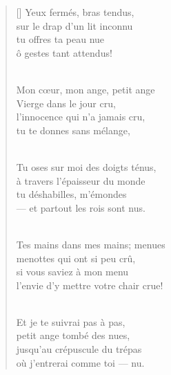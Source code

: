 \documentclass[11pt,a4paper]{article}
\begin{document}
\thispagestyle{empty}


\settowidth{\versewidth}{l'envie d'y mettre votre chair crue!}

\bigskip

\begin{verse}[\versewidth]
Yeux fermés, bras tendus, \\
sur le drap d'un lit inconnu \\
tu offres ta peau nue \\
ô gestes tant attendus! \\ \

Mon cœur, mon ange, petit ange \\
Vierge dans le jour cru, \\
l'innocence qui n'a jamais cru, \\
tu te donnes sans mélange, \\ \

Tu oses sur moi des doigts ténus, \\
à travers l'épaisseur du monde \\
tu déshabilles, m'émondes \\
--- et partout les rois sont nus. \\ \

Tes mains dans mes mains; menues \\
menottes qui ont si peu crû, \\
si vous saviez à mon menu \\
l'envie d'y mettre votre chair crue! \\ \

Et je te suivrai pas à pas, \\
petit ange tombé des nues, \\
jusqu'au crépuscule du trépas \\
où j'entrerai comme toi --- nu.
\end{verse}
\end{document}
